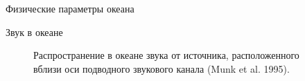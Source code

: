 \begin{chapter}{Физические параметры океана}
\begin{section}{Звук в океане}
\begin{figure}[t!]
\caption{Распространение в океане звука от источника, расположенного вблизи
оси подводного звукового канала (Munk et al. 1995).}
\label{fig:raypaths}
\end{figure}
%
% 


\end{section}
\end{chapter}
